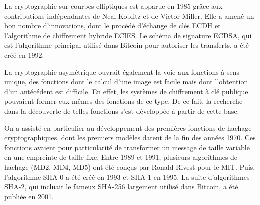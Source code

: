 
La cryptographie sur courbes elliptiques est apparue en 1985 grâce aux contributions indépendantes de Neal Koblitz et de Victor Miller. Elle a amené un bon nombre d'innovations, dont le procédé d'échange de clés ECDH et l'algorithme de chiffrement hybride ECIES. Le schéma de signature ECDSA, qui est l'algorithme principal utilisé dans Bitcoin pour autoriser les transferts, a été créé en 1992.


La cryptographie asymétrique ouvrait également la voie aux fonctions à sens unique, des fonctions dont le calcul d'une image est facile mais dont l'obtention d'un antécédent est difficile. En effet, les systèmes de chiffrement à clé publique pouvaient former eux-mêmes des fonctions de ce type. De ce fait, la recherche dans la découverte de telles fonctions s'est développée à partir de cette base.

On a assisté en particulier au développement des premières fonctions de hachage cryptographiques, dont les premiers modèles datent de la fin des années 1970. Ces fonctions avaient pour particularité de transformer un message de taille variable en une empreinte de taille fixe. Entre 1989 et 1991, plusieurs algorithmes de hachage (MD2, MD4, MD5) ont été conçus par Ronald Rivest pour le MIT. Puis, l'algorithme SHA-0 a été créé en 1993 et SHA-1 en 1995. La suite d'algorithmes SHA-2, qui incluait le fameux SHA-256 largement utilisé dans Bitcoin, a été publiée en 2001.

